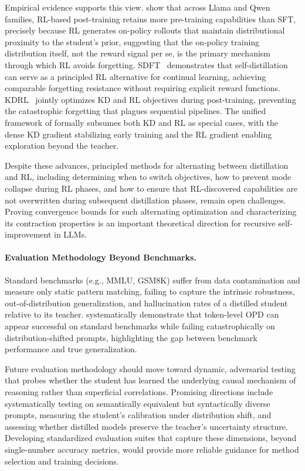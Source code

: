 \documentclass{article} %
\begin{document}
Empirical evidence supports this view. \citet{2510.18874} show that across Llama and Qwen families, RL-based post-training retains more pre-training capabilities than SFT, precisely because RL generates on-policy rollouts that maintain distributional proximity to the student's prior, suggesting that the on-policy training distribution itself, not the reward signal per se, is the primary mechanism through which RL avoids forgetting. SDFT~\citep{2601.19897} demonstrates that self-distillation can serve as a principled RL alternative for continual learning, achieving comparable forgetting resistance without requiring explicit reward functions. KDRL~\citep{2506.02208} jointly optimizes KD and RL objectives during post-training, preventing the catastrophic forgetting that plagues sequential pipelines. The unified framework of \citet{2512.23097} formally subsumes both KD and RL as special cases, with the dense KD gradient stabilizing early training and the RL gradient enabling exploration beyond the teacher.

Despite these advances, principled methods for alternating between distillation and RL, including determining when to switch objectives, how to prevent mode collapse during RL phases, and how to ensure that RL-discovered capabilities are not overwritten during subsequent distillation phases, remain open challenges. Proving convergence bounds for such alternating optimization and characterizing its contraction properties is an important theoretical direction for recursive self-improvement in LLMs.

\paragraph{Evaluation Methodology Beyond Benchmarks.}
Standard benchmarks (e.g., MMLU, GSM8K) suffer from data contamination and measure only static pattern matching, failing to capture the intrinsic robustness, out-of-distribution generalization, and hallucination rates of a distilled student relative to its teacher. \citet{2603.25562} systematically demonstrate that token-level OPD can appear successful on standard benchmarks while failing catastrophically on distribution-shifted prompts, highlighting the gap between benchmark performance and true generalization.

Future evaluation methodology should move toward dynamic, adversarial testing that probes whether the student has learned the underlying causal mechanism of reasoning rather than superficial correlations. Promising directions include systematically testing on semantically equivalent but syntactically diverse prompts, measuring the student's calibration under distribution shift, and assessing whether distilled models preserve the teacher's uncertainty structure. Developing standardized evaluation suites that capture these dimensions, beyond single-number accuracy metrics, would provide more reliable guidance for method selection and training decisions.
\end{document}
